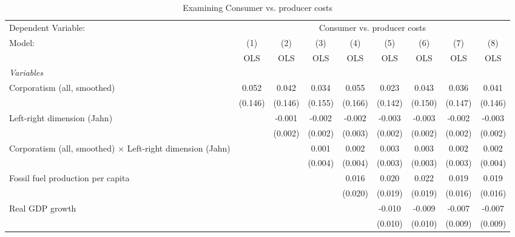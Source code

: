
\begin{table}[htbp]
   \caption{Examining Consumer vs. producer costs}
   \centering
   \begin{tabular}{lcccccccc}
      \toprule
      Dependent Variable: & \multicolumn{8}{c}{Consumer vs. producer costs}\\
      Model:                                                            & (1)     & (2)     & (3)     & (4)     & (5)     & (6)     & (7)     & (8)\\  
                                                                        &  OLS    & OLS     & OLS     & OLS     & OLS     & OLS     & OLS     & OLS\\  
      \midrule
      \emph{Variables}\\
      Corporatism (all, smoothed)                                       & 0.052   & 0.042   & 0.034   & 0.055   & 0.023   & 0.043   & 0.036   & 0.041\\   
                                                                        & (0.146) & (0.146) & (0.155) & (0.166) & (0.142) & (0.150) & (0.147) & (0.146)\\   
      Left-right dimension (Jahn)                                       &         & -0.001  & -0.002  & -0.002  & -0.003  & -0.003  & -0.002  & -0.003\\   
                                                                        &         & (0.002) & (0.002) & (0.003) & (0.002) & (0.002) & (0.002) & (0.002)\\   
      Corporatism (all, smoothed) $\times$ Left-right dimension (Jahn)  &         &         & 0.001   & 0.002   & 0.003   & 0.003   & 0.002   & 0.002\\   
                                                                        &         &         & (0.004) & (0.004) & (0.003) & (0.003) & (0.003) & (0.004)\\   
      Fossil fuel production per capita                                 &         &         &         & 0.016   & 0.020   & 0.022   & 0.019   & 0.019\\   
                                                                        &         &         &         & (0.020) & (0.019) & (0.019) & (0.016) & (0.016)\\   
      Real GDP growth                                                   &         &         &         &         & -0.010  & -0.009  & -0.007  & -0.007\\   
                                                                        &         &         &         &         & (0.010) & (0.010) & (0.009) & (0.009)\\   

\end{tabular}
\end{table}
